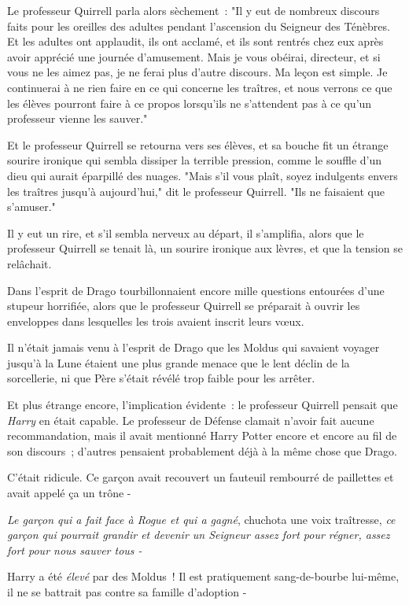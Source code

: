 Le professeur Quirrell parla alors sèchement~: "Il y eut de nombreux discours faits pour les oreilles des adultes pendant l'ascension du Seigneur des Ténèbres. Et les adultes ont applaudit, ils ont acclamé, et ils sont rentrés chez eux après avoir apprécié une journée d'amusement. Mais je vous obéirai, directeur, et si vous ne les aimez pas, je ne ferai plus d'autre discours. Ma leçon est simple. Je continuerai à ne rien faire en ce qui concerne les traîtres, et nous verrons ce que les élèves pourront faire à ce propos lorsqu'ils ne s'attendent pas à ce qu'un professeur vienne les sauver."

Et le professeur Quirrell se retourna vers ses élèves, et sa bouche fit un étrange sourire ironique qui sembla dissiper la terrible pression, comme le souffle d'un dieu qui aurait éparpillé des nuages. "Mais s'il vous plaît, soyez indulgents envers les traîtres jusqu'à aujourd'hui," dit le professeur Quirrell. "Ils ne faisaient que s'amuser."

Il y eut un rire, et s'il sembla nerveux au départ, il s'amplifia, alors que le professeur Quirrell se tenait là, un sourire ironique aux lèvres, et que la tension se relâchait.

\later

Dans l'esprit de Drago tourbillonnaient encore mille questions entourées d'une stupeur horrifiée, alors que le professeur Quirrell se préparait à ouvrir les enveloppes dans lesquelles les trois avaient inscrit leurs vœux.

Il n'était jamais venu à l'esprit de Drago que les Moldus qui savaient voyager jusqu'à la Lune étaient une plus grande menace que le lent déclin de la sorcellerie, ni que Père s'était révélé trop faible pour les arrêter.

Et plus étrange encore, l'implication évidente~: le professeur Quirrell pensait que \emph{Harry} en était capable. Le professeur de Défense clamait n'avoir fait aucune recommandation, mais il avait mentionné Harry Potter encore et encore au fil de son discours~; d'autres pensaient probablement déjà à la même chose que Drago.

C'était ridicule. Ce garçon avait recouvert un fauteuil rembourré de paillettes et avait appelé ça un trône -

\emph{Le garçon qui a fait face à Rogue et qui a gagné}, chuchota une voix traîtresse, \emph{ce garçon qui pourrait grandir et devenir un Seigneur assez fort pour régner, assez fort pour nous sauver tous -}

Harry a été \emph{élevé} par des Moldus~! Il est pratiquement sang-de-bourbe lui-même, il ne se battrait pas contre sa famille d'adoption -

